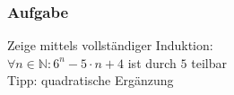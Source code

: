 \begin{frame}
	\frametitle{Aufgabe}
	Zeige mittels vollständiger Induktion:\\
	$\forall n\in\mathbb{N}: 6^{n}-5\cdot n+4$ ist durch $5$ teilbar\\
	Tipp: quadratische Ergänzung\\
\end{frame}
